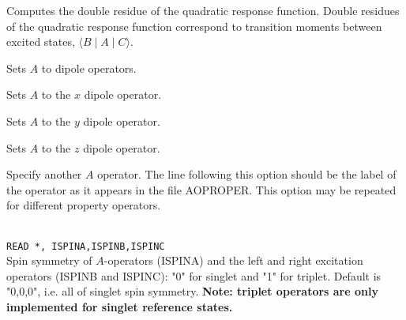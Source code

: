 \begin{description}

\item{}
Computes the double residue
of the quadratic
response function.
Double residues of the quadratic response function correspond to transition
moments between excited states,
$\langle B \mid A \mid C \rangle$. 

\item{}
Sets $A$ to dipole operators.

\item{}
Sets $A$ to the $x$ dipole operator.

\item{}
Sets $A$ to the $y$ dipole operator.

\item{}
Sets $A$ to the $z$ dipole operator.

\item[\Key{PROPRT}]
Specify another $A$ operator. The line following this
option should be the label of the operator as it appears in the file
AOPROPER. This option may be repeated for different property operators.

\item{}\\
\verb|READ *, ISPINA,ISPINB,ISPINC|\\
Spin symmetry of $A$-operators (ISPINA)
and the left and right excitation operators (ISPINB and ISPINC):
"0" for singlet and "1" for triplet.
Default is "0,0,0", i.e. all of singlet spin symmetry.
{\bf Note: triplet operators are only implemented for singlet reference states.}



\end{description}
